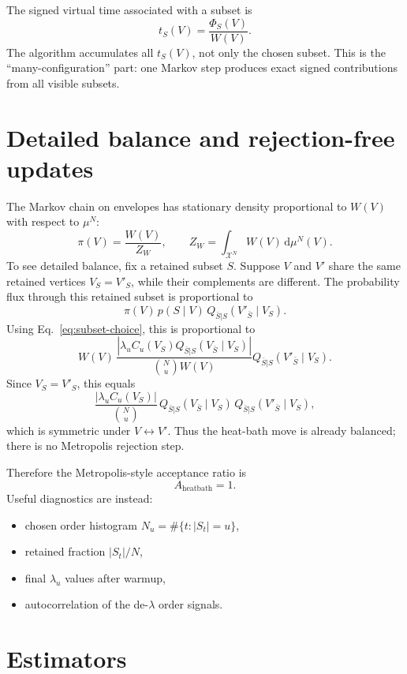\documentclass[11pt]{article}
\newcommand{\dd}{\mathrm{d}}
\newcommand{\1}{\mathbf{1}}
\newcommand{\calX}{\mathcal{X}}
\newcommand{\card}[1]{\left|#1\right|}
\begin{document}
The signed virtual time associated with a subset is
\[
  t_S(V)
  =
  \frac{\Phi_S(V)}{W(V)}.
  \label{eq:times}
\]
The algorithm accumulates all \(t_S(V)\), not only the chosen subset.  This
is the ``many-configuration'' part: one Markov step produces exact signed
contributions from all visible subsets.

\section{Detailed balance and rejection-free updates}

The Markov chain on envelopes has stationary density proportional to \(W(V)\)
with respect to \(\mu^N\):
\[
  \pi(V)=\frac{W(V)}{Z_W},\qquad
  Z_W=\int_{\calX^N} W(V)\,\dd\mu^N(V).
\]
To see detailed balance, fix a retained subset \(S\).  Suppose \(V\) and
\(V'\) share the same retained vertices \(V_S=V'_S\), while their complements
are different.  The probability flux through this retained subset is
proportional to
\[
  \pi(V)\,
  p(S\mid V)\,
  Q_{\bar S|S}(V'_{\bar S}\mid V_S).
\]
Using Eq.~\eqref{eq:subset-choice}, this is proportional to
\[
  W(V)\,
  \frac{|\lambda_u C_u(V_S)Q_{\bar S|S}(V_{\bar S}\mid V_S)|}
       {\binom{N}{u}W(V)}
  Q_{\bar S|S}(V'_{\bar S}\mid V_S).
\]
Since \(V_S=V'_S\), this equals
\[
  \frac{|\lambda_u C_u(V_S)|}{\binom{N}{u}}\,
  Q_{\bar S|S}(V_{\bar S}\mid V_S)\,
  Q_{\bar S|S}(V'_{\bar S}\mid V_S),
\]
which is symmetric under \(V\leftrightarrow V'\).  Thus the heat-bath move is
already balanced; there is no Metropolis rejection step.

Therefore the Metropolis-style acceptance ratio is
\[
  A_{\mathrm{heatbath}}=1.
\]
Useful diagnostics are instead:
\begin{itemize}[leftmargin=2em]
  \item chosen order histogram \(N_u=\#\{t:\card{S_t}=u\}\),
  \item retained fraction \(\card{S_t}/N\),
  \item final \(\lambda_u\) values after warmup,
  \item autocorrelation of the de-\(\lambda\) order signals.
\end{itemize}

\section{Estimators}
\end{document}
